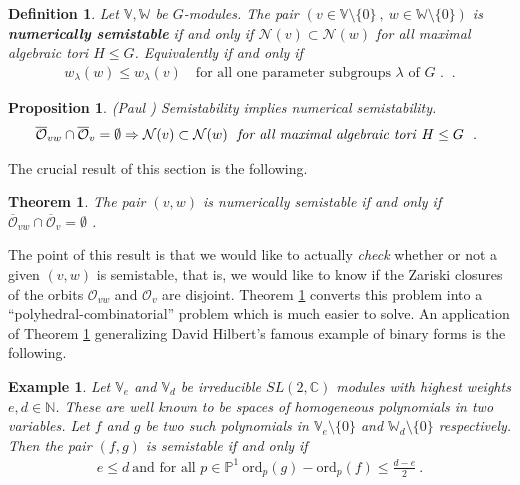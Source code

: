 \documentclass[12pt]{amsart}
\newtheorem{theorem}{Theorem}
\newtheorem{proposition}{Proposition}
\newtheorem{definition}{Definition}
\newtheorem{example}{Example}
\numberwithin{equation}{section}
\numberwithin{remark}{section}
\numberwithin{theorem}{section}
\numberwithin{proposition}{section}
\numberwithin{definition}{section}
\numberwithin{lemma}{section}
\numberwithin{claim}{section}
\numberwithin{corollary}{section}
\numberwithin{conjecture}{section}
\begin{document}
\begin{definition}\label{numerical}   \emph{Let $\mathbb{V},\mathbb{W}$ be $G$-modules. The pair $(v\in\mathbb{V}\setminus\{0\} \ , \ w\in \mathbb{W}\setminus\{0\} )$ is \textbf{\emph{numerically semistable}} if and only if  $\mathcal{N}(v)\subset \mathcal{N}(w)$    for all maximal algebraic tori $H\leq G$. Equivalently if and only if
\begin{align}
w_{\lambda}(w)\leq w_{\lambda}(v) \quad \mbox{for all one parameter subgroups $\lambda$ of $G$ . } \ .
\end{align}
  }
 \end{definition}

 \begin{proposition} (Paul \cite{paulcm2012}) \emph{Semistability implies numerical semistability}.
\begin{align}
\overline{\mathcal{O}}_{vw}\cap\overline{\mathcal{O}}_{v}=\emptyset \Rightarrow  \mathcal{N}(v)\subset \mathcal{N}(w) \ \mbox{ \emph{for all maximal algebraic tori} $H\leq G$ \ .   } 
\end{align}
\end{proposition}
 The crucial result of this section is the following.
  \begin{theorem}\label{numericalcriterion} \emph{ The pair $(v,w)$  is numerically semistable if and only if $\overline{\mathcal{O}}_{vw}\cap\overline{\mathcal{O}}_{v}=\emptyset$ .}
 \end{theorem}
The point of this result is that we would like to actually \emph{check} whether or not a given $(v,w)$ is semistable, that is, we would like to know if the Zariski closures of the orbits $\mathcal{O}_{vw}$ and $\mathcal{O}_v$ are disjoint. Theorem \ref{numericalcriterion} converts this problem into a ``polyhedral-combinatorial'' problem which is much easier to solve.  An application of Theorem \ref{numericalcriterion} generalizing David Hilbert's famous example of binary forms is the following.
   \begin{example}
\emph{Let $\mathbb{V}_e$ and  $\mathbb{V}_d$ be irreducible $SL(2,\mathbb{C})$ modules with highest weights $e , d \in\mathbb{N}$. These are well known to be spaces of homogeneous polynomials in two variables. Let $f$ and $g$ be two such polynomials in $\mathbb{V}_e\setminus\{0\}$ and $\mathbb{W}_d\setminus\{0\}$
respectively. Then the pair $(f,g)$ is semistable if and only if
\begin{align}\label{d-e/2}
e\leq d \ \mbox{and for all $p\in \mathbb{P}^1$}\ \mbox{ord}_p(g)-\mbox{ord}_p(f)\leq \frac{d-e}{2} \ .
\end{align}}
\end{example} 
   
\end{document}
